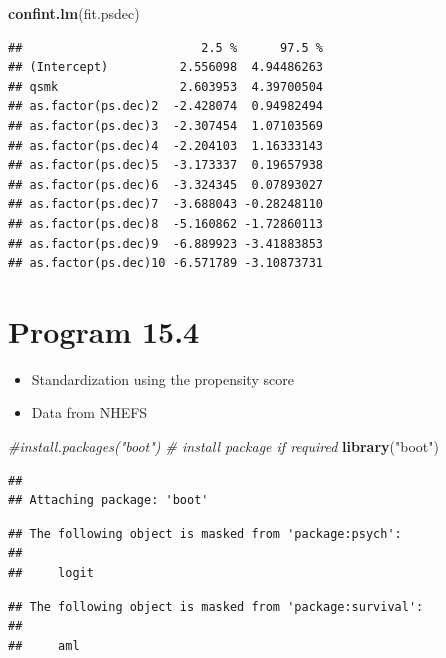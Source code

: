 \documentclass[
  10pt,
]{book}
\newenvironment{Shaded}{\begin{snugshade}}{\end{snugshade}}
\newcommand{\CommentTok}[1]{\textcolor[rgb]{0.56,0.35,0.01}{\textit{#1}}}
\newcommand{\KeywordTok}[1]{\textcolor[rgb]{0.13,0.29,0.53}{\textbf{#1}}}
\newcommand{\NormalTok}[1]{#1}
\newcommand{\StringTok}[1]{\textcolor[rgb]{0.31,0.60,0.02}{#1}}
\providecommand{\tightlist}{%
  \setlength{\itemsep}{0pt}\setlength{\parskip}{0pt}}
\begin{document}
\begin{Shaded}
\begin{Highlighting}[]
\KeywordTok{confint.lm}\NormalTok{(fit.psdec)}
\end{Highlighting}
\end{Shaded}

\begin{verbatim}
##                         2.5 %      97.5 %
## (Intercept)          2.556098  4.94486263
## qsmk                 2.603953  4.39700504
## as.factor(ps.dec)2  -2.428074  0.94982494
## as.factor(ps.dec)3  -2.307454  1.07103569
## as.factor(ps.dec)4  -2.204103  1.16333143
## as.factor(ps.dec)5  -3.173337  0.19657938
## as.factor(ps.dec)6  -3.324345  0.07893027
## as.factor(ps.dec)7  -3.688043 -0.28248110
## as.factor(ps.dec)8  -5.160862 -1.72860113
## as.factor(ps.dec)9  -6.889923 -3.41883853
## as.factor(ps.dec)10 -6.571789 -3.10873731
\end{verbatim}

\hypertarget{program-15.4}{%
\section{Program 15.4}\label{program-15.4}}

\begin{itemize}
\tightlist
\item
  Standardization using the propensity score
\item
  Data from NHEFS
\end{itemize}

\begin{Shaded}
\begin{Highlighting}[]
\CommentTok{\#install.packages("boot") \# install package if required}
\KeywordTok{library}\NormalTok{(}\StringTok{"boot"}\NormalTok{)}
\end{Highlighting}
\end{Shaded}

\begin{verbatim}
## 
## Attaching package: 'boot'
\end{verbatim}

\begin{verbatim}
## The following object is masked from 'package:psych':
## 
##     logit
\end{verbatim}

\begin{verbatim}
## The following object is masked from 'package:survival':
## 
##     aml
\end{verbatim}
\end{document}
